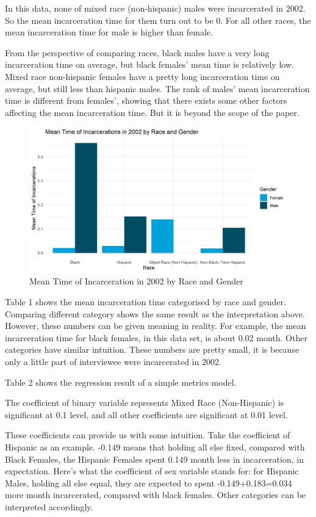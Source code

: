 \documentclass{article}
\begin{document}
In this data, none of mixed race (non-hispanic) males were incarcerated in 2002. So the mean incarceration time for them turn out to be 0. For all other races, the mean incarceration time for male is higher than female. 

From the perspective of comparing races, black males have a very long incarceration time on average, but black females' mean time is relatively low. Mixed race non-hispanic females have a pretty long incarceration time on average, but still less than hispanic males. The rank of males' mean incarceration time is different from females', showing that there exists some other factors affecting the mean incarceration time. But it is beyond the scope of the paper.


\begin{figure}[H]
    \begin{center}
        \includegraphics[width=.85\textwidth]{incarcerations_by_racegender}
    \end{center}
    \caption{Mean Time of Incarceration in 2002 by Race and Gender}
    \label{fig:graph}
\end{figure}


Table 1 shows the mean incarceration time categorised by race and gender. Comparing different category shows the same result as the interpretation above. However, these numbers can be given meaning in reality. For example, the mean incarceration time for black females, in this data set, is about 0.02 month. Other categories have similar intuition. These numbers are pretty small, it is because only a little part of interviewee were incarcerated in 2002. 



Table 2 shows the regression result of a simple metrics model. 

The coefficient of binary variable represents Mixed Race (Non-Hispanic) is significant at 0.1 level, and all other coefficients are significant at 0.01 level. 

These coefficients can provide us with some intuition. Take the coefficient of Hispanic as an example. -0.149 means that holding all else fixed, compared with Black Females, the Hispanic Females spent 0.149 month less in incarceration, in expectation. Here's what the coefficient of sex variable stands for: for Hispanic Males, holding all else equal, they are expected to spent -0.149+0.183=0.034 more month incarcerated, compared with black females. Other categories can be interpreted accordingly.


\end{document}
